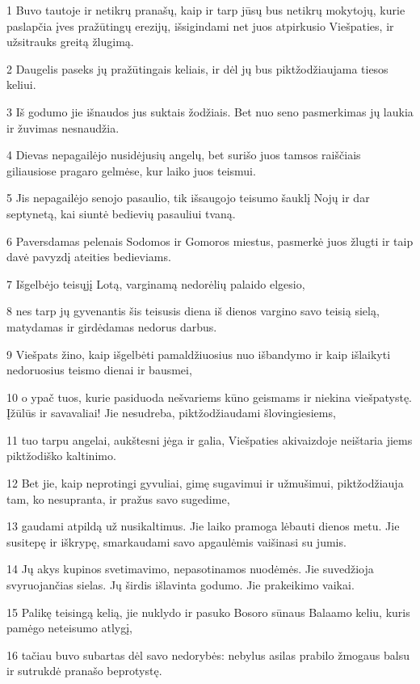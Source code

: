 \par 1 Buvo tautoje ir netikrų pranašų, kaip ir tarp jūsų bus netikrų mokytojų, kurie paslapčia įves pražūtingų erezijų, išsigindami net juos atpirkusio Viešpaties, ir užsitrauks greitą žlugimą. 
\par 2 Daugelis paseks jų pražūtingais keliais, ir dėl jų bus piktžodžiaujama tiesos keliui. 
\par 3 Iš godumo jie išnaudos jus suktais žodžiais. Bet nuo seno pasmerkimas jų laukia ir žuvimas nesnaudžia. 
\par 4 Dievas nepagailėjo nusidėjusių angelų, bet surišo juos tamsos raiščiais giliausiose pragaro gelmėse, kur laiko juos teismui. 
\par 5 Jis nepagailėjo senojo pasaulio, tik išsaugojo teisumo šauklį Nojų ir dar septynetą, kai siuntė bedievių pasauliui tvaną. 
\par 6 Paversdamas pelenais Sodomos ir Gomoros miestus, pasmerkė juos žlugti ir taip davė pavyzdį ateities bedieviams. 
\par 7 Išgelbėjo teisųjį Lotą, varginamą nedorėlių palaido elgesio, 
\par 8 nes tarp jų gyvenantis šis teisusis diena iš dienos vargino savo teisią sielą, matydamas ir girdėdamas nedorus darbus. 
\par 9 Viešpats žino, kaip išgelbėti pamaldžiuosius nuo išbandymo ir kaip išlaikyti nedoruosius teismo dienai ir bausmei, 
\par 10 o ypač tuos, kurie pasiduoda nešvariems kūno geismams ir niekina viešpatystę. Įžūlūs ir savavaliai! Jie nesudreba, piktžodžiaudami šlovingiesiems, 
\par 11 tuo tarpu angelai, aukštesni jėga ir galia, Viešpaties akivaizdoje neištaria jiems piktžodiško kaltinimo. 
\par 12 Bet jie, kaip neprotingi gyvuliai, gimę sugavimui ir užmušimui, piktžodžiauja tam, ko nesupranta, ir pražus savo sugedime, 
\par 13 gaudami atpildą už nusikaltimus. Jie laiko pramoga lėbauti dienos metu. Jie susitepę ir iškrypę, smarkaudami savo apgaulėmis vaišinasi su jumis. 
\par 14 Jų akys kupinos svetimavimo, nepasotinamos nuodėmės. Jie suvedžioja svyruojančias sielas. Jų širdis išlavinta godumo. Jie prakeikimo vaikai. 
\par 15 Palikę teisingą kelią, jie nuklydo ir pasuko Bosoro sūnaus Balaamo keliu, kuris pamėgo neteisumo atlygį, 
\par 16 tačiau buvo subartas dėl savo nedorybės: nebylus asilas prabilo žmogaus balsu ir sutrukdė pranašo beprotystę. 
